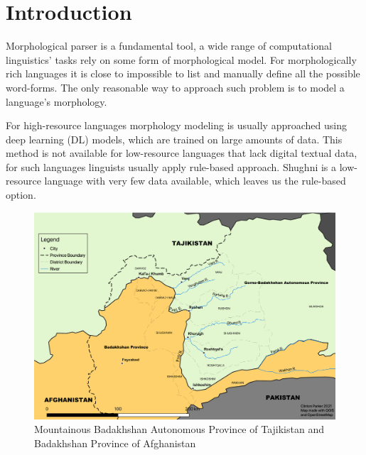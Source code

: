 \section{Introduction}

\par Morphological parser is a fundamental tool, a wide range of computational linguistics' tasks rely on some form of morphological model. For morphologically rich languages it is close to impossible to list and manually define all the possible word-forms. The only reasonable way to approach such problem is to model a language's morphology. 
\par For high-resource languages morphology modeling is usually approached using deep learning (DL) models, which are trained on large amounts of data. This method is not available for low-resource languages that lack digital textual data, for such languages linguists usually apply rule-based approach. Shughni is a low-resource language with very few data available, which leaves us the rule-based option.
\begin{figure}[!b]
    \centering
    \includegraphics[scale=0.125]{map.png}
    \caption{Mountainous Badakhshan Autonomous Province of Tajikistan and Badakhshan Province of Afghanistan}
    \label{fig:map1}
\end{figure}
